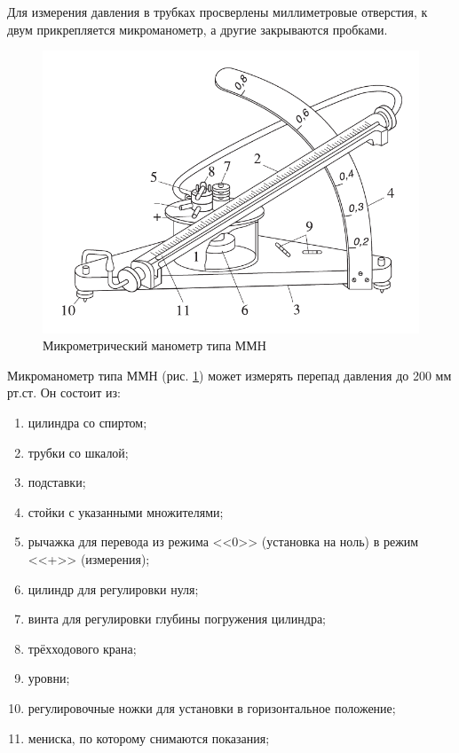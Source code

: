 \documentclass[12pt]{article}
\begin{document}
	Для измерения давления в трубках просверлены миллиметровые отверстия, к двум прикрепляется микроманометр, а другие закрываются пробками.
	
	\begin{figure}[!h]
	\caption{Микрометрический манометр типа ММН}
	\label{fig:mmn}
	\begin{center}
	\includegraphics[scale=0.7]{mmn.png}
	\end{center}
	\end{figure}
	
	Микроманометр типа ММН (рис. \ref{fig:mmn}) может измерять перепад давления до 200 мм рт.ст. Он состоит из:
	\begin{enumerate}
		\item цилиндра со спиртом;
		\item трубки со шкалой;
		\item подставки;
		\item стойки с указанными множителями;
		\item рычажка для перевода из режима <<0>> (установка на ноль) в режим <<+>> (измерения);
		\item цилиндр для регулировки нуля;
		\item винта для регулировки глубины погружения цилиндра;
		\item трёхходового крана;
		\item уровни;
		\item регулировочные ножки для установки в горизонтальное положение;
		\item мениска, по которому снимаются показания;
	\end{enumerate}
	
\end{document}
